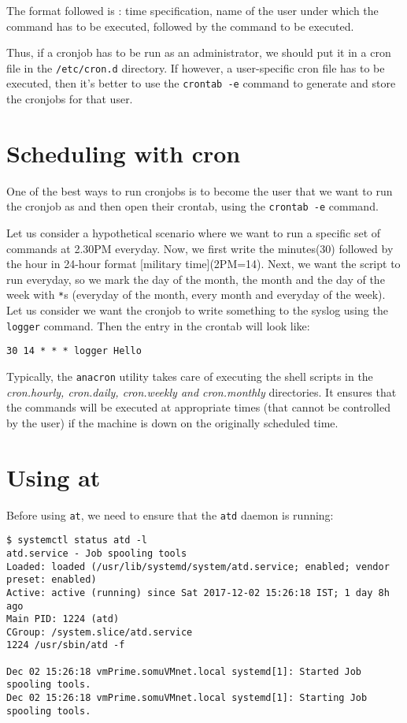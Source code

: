 \noindent
The format followed is : time specification, name of the user under which the command has to be executed, followed by the command to be executed. 

Thus, if a cronjob has to be run as an administrator, we should put it in a cron file in the \verb|/etc/cron.d| directory. If however, a user-specific cron file has to be executed, then it's better to use the \verb|crontab -e| command to generate and store the cronjobs for that user. 

	\section{Scheduling with cron}
One of the best ways to run cronjobs is to become the user that we want to run the cronjob as and then open their crontab, using the \verb|crontab -e| command. 

Let us consider a hypothetical scenario where we want to run a specific set of commands at 2.30PM everyday. Now, we first write the minutes(30) followed by the hour in 24-hour format [military time](2PM=14). Next, we want the script to run everyday, so we mark the day of the month, the month and the day of the week with \verb|*|s (everyday of the month, every month and everyday of the week). Let us consider we want the cronjob to write something to the syslog using the \verb|logger| command. Then the entry in the crontab will look like:

\vspace{-15pt}
\begin{verbatim}
30 14 * * *	logger Hello
\end{verbatim}
\vspace{-10pt}

\noindent
Typically, the \verb|anacron| utility takes care of executing the shell scripts in the  \textit{cron.hourly, cron.daily, cron.weekly and cron.monthly} directories. It ensures that the commands will be executed at appropriate times (that cannot be controlled by the user) if the machine is down on the originally scheduled time. 

	\section{Using at}
Before using \verb|at|, we need to ensure that the \verb|atd| daemon is running:

\vspace{-15pt}
\begin{verbatim}
$ systemctl status atd -l
atd.service - Job spooling tools
Loaded: loaded (/usr/lib/systemd/system/atd.service; enabled; vendor preset: enabled)
Active: active (running) since Sat 2017-12-02 15:26:18 IST; 1 day 8h ago
Main PID: 1224 (atd)
CGroup: /system.slice/atd.service
1224 /usr/sbin/atd -f

Dec 02 15:26:18 vmPrime.somuVMnet.local systemd[1]: Started Job spooling tools.
Dec 02 15:26:18 vmPrime.somuVMnet.local systemd[1]: Starting Job spooling tools.
\end{verbatim}
\vspace{-10pt}

